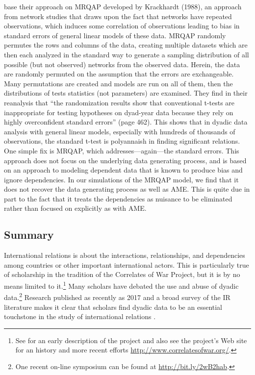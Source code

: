 \citet{erikson:pinto:2014} base their approach on MRQAP developed by 
Krackhardt (1988), \nocite{krackhart:1988} an approach from network studies that draws upon the fact that networks have repeated observations, which induces some correlation of observations leading to bias in standard errors of general linear models of these data. MRQAP randomly permutes the rows and columns of the data, creating multiple datasets which are then each analyzed in the standard way to generate a sampling distribution of all possible (but not observed) networks from the observed data. Herein, the data are randomly permuted on the assumption that the errors are exchangeable.  Many permutations are created and models are run on all of them, then the distributions of tests statistics (not parameters) are examined. They find in their reanalysis that ``the randomization results show that conventional t-tests are inappropriate for
testing hypotheses on dyad-year data because they rely on highly overconfident standard errors'' (page 462).  This shows that in dyadic data analysis with general linear models, especially with hundreds of thousands of observations, the standard t-test is polyannaish in finding significant relations.  One simple fix is MRQAP, which addresses---again---the standard errors. This approach does not focus on the underlying data generating process, and is based on an approach to modeling dependent data that is known to produce bias and ignore dependencies.  In our simulations of the MRQAP model, we find that it does not recover the data generating process as well as AME. This is quite due in part to the fact that it treats the dependencies as nuisance to be eliminated rather than focused on explicitly as with AME. 



\subsection*{Summary}
International relations is about the interactions, relationships, and dependencies among countries or other important international actors. This is particularly true of scholarship in the tradition of the Correlates of War Project, but it is by no means limited to it.\footnote{See \cite{singer:1972} for an early description of the project and also see the project's Web site for an history and more recent efforts \url{http://www.correlatesofwar.org/}.} Many scholars have debated the use and abuse of dyadic data.\footnote{One recent on-line symposium can be found at \url{http://bit.ly/2wB2hab}.} Research published as recently as 2017 and a broad survey of the IR literature makes it clear that scholars find dyadic data to be an essential touchstone in the study of international relations \citep{erikson:pinto:2014,aronow:etal:2015}.

